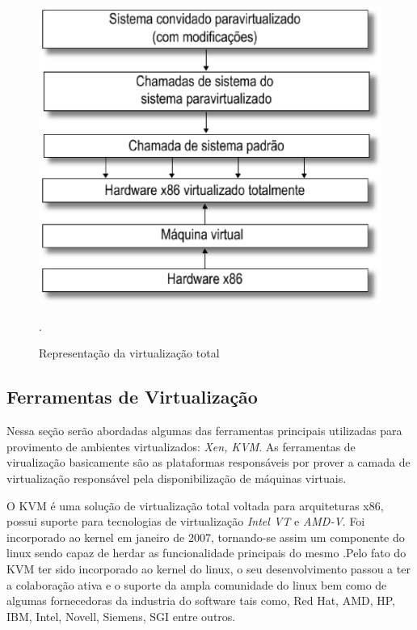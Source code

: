 \begin{figure}[!htb]
\centering
\includegraphics [keepaspectratio=true,scale=0.3]{figuras/paravirtualization.eps}
\caption{Representação da virtualização total}
\cite{marcos}.
\label{paravirtualization}
\end{figure}

\subsection{Ferramentas de Virtualização}
Nessa seção serão abordadas algumas das ferramentas principais utilizadas para provimento de ambientes virtualizados: \textit{Xen, KVM}. As ferramentas de virualização basicamente são as plataformas responsáveis por prover a camada de virtualização responsável pela disponibilização de máquinas virtuais.

O KVM é uma solução de virtualização total voltada para arquiteturas x86, possui suporte para tecnologias de virtualização \textit{Intel VT} e \textit{AMD-V}. Foi incorporado ao kernel em janeiro de 2007, tornando-se assim um componente do linux sendo capaz de herdar as funcionalidade principais do mesmo \cite{redhatkvm,qumranet}.Pelo fato do KVM ter sido incorporado ao kernel do linux, o seu desenvolvimento passou a ter a colaboração ativa e o suporte da ampla comunidade do linux bem como de algumas fornecedoras da industria do software tais como, Red Hat, AMD, HP, IBM, Intel, Novell, Siemens, SGI entre outros\cite {redhatkvm}.

